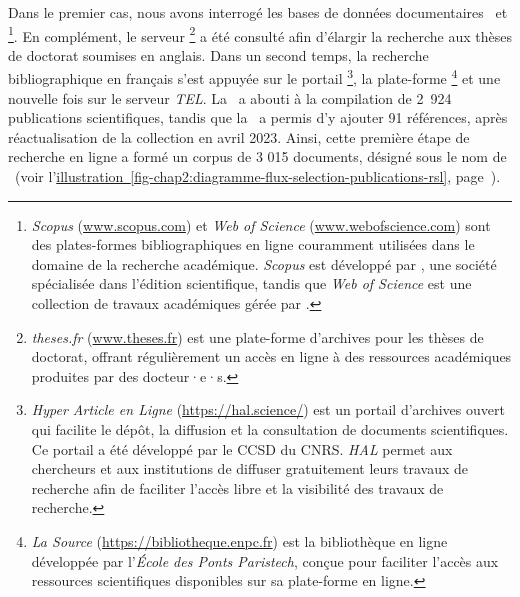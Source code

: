\begin{refsegment}
Dans le premier cas, nous avons interrogé les bases de données documentaires ~et \footnote{
    \textsl{Scopus} (\url{www.scopus.com}) et \textsl{Web of Science} (\url{www.webofscience.com}) sont des plates-formes bibliographiques en ligne couramment utilisées dans le domaine de la recherche académique. \textsl{Scopus} est développé par , une société spécialisée dans l'édition scientifique, tandis que \textsl{Web of Science} est une collection de travaux académiques gérée par .
}. En complément, le serveur \footnote{
    \textsl{theses.fr} (\url{www.theses.fr}) est une plate-forme d'archives pour les thèses de doctorat, offrant régulièrement un accès en ligne à des ressources académiques produites par des docteur·e·s.
} a été consulté afin d'élargir la recherche aux thèses de doctorat soumises en anglais. Dans un second temps, la recherche bibliographique en français s'est appuyée sur le portail \footnote{
    \textsl{Hyper Article en Ligne} (\url{https://hal.science/}) est un portail d'archives ouvert qui facilite le dépôt, la diffusion et la consultation de documents scientifiques. Ce portail a été développé par le \acrfull{CCSD} du \acrfull{CNRS}. \textsl{HAL} permet aux chercheurs et aux institutions de diffuser gratuitement leurs travaux de recherche afin de faciliter l'accès libre et la visibilité des travaux de recherche.
}, la plate-forme \footnote{
    \textsl{La Source} (\url{https://bibliotheque.enpc.fr}) est la bibliothèque en ligne développée par l'\textsl{École des Ponts Paristech}, conçue pour faciliter l'accès aux ressources scientifiques disponibles sur sa plate-forme en ligne.
} et une nouvelle fois sur le serveur \textsl{TEL}. La ~a abouti à la compilation de 2~924 publications scientifiques, tandis que la ~a permis d'y ajouter 91 références, après réactualisation de la collection en avril 2023. Ainsi, cette première étape de recherche en ligne a formé un corpus de 3 015 documents, désigné sous le nom de ~(voir l'\hyperref[fig-chap2:diagramme-flux-selection-publications-rsl]{illustration~\ref{fig-chap2:diagramme-flux-selection-publications-rsl}}, page~\pageref{fig-chap2:diagramme-flux-selection-publications-rsl}).%



\end{refsegment}
